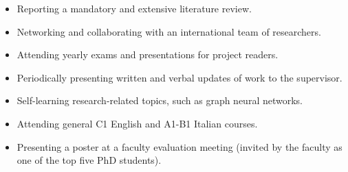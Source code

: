 \begin{enumerate}[leftmargin=*]
    \begin{itemize}
        \item Reporting a mandatory and extensive literature review.
        \item Networking and collaborating with an international team of researchers.
        \item Attending yearly exams and presentations for project readers.
        \item Periodically presenting written and verbal updates of work to the supervisor.
        \item Self-learning research-related topics, such as graph neural networks.
        \item Attending general C1 English and A1-B1 Italian courses.
        \item Presenting a poster at a faculty evaluation meeting (invited by the faculty as one of the top five PhD students).
    \end{itemize}
\end{enumerate}


